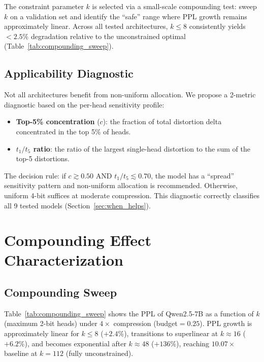 \documentclass[11pt,a4paper]{article}
\begin{document}
The constraint parameter $k$ is selected via a small-scale compounding test: sweep $k$ on a validation set and identify the ``safe'' range where PPL growth remains approximately linear.
Across all tested architectures, $k \le 8$ consistently yields $<2.5\%$ degradation relative to the unconstrained optimal (Table~\ref{tab:compounding_sweep}).

\subsection{Applicability Diagnostic}

Not all architectures benefit from non-uniform allocation.
We propose a 2-metric diagnostic based on the per-head sensitivity profile:

\begin{itemize}[leftmargin=*,itemsep=2pt]
\item \textbf{Top-5\% concentration} ($c$): the fraction of total distortion delta concentrated in the top 5\% of heads.
\item \textbf{$t_1/t_5$ ratio}: the ratio of the largest single-head distortion to the sum of the top-5 distortions.
\end{itemize}

The decision rule: if $c \gtrsim 0.50$ AND $t_1/t_5 \lesssim 0.70$, the model has a ``spread'' sensitivity pattern and non-uniform allocation is recommended.
Otherwise, uniform 4-bit suffices at moderate compression.
This diagnostic correctly classifies all 9 tested models (Section~\ref{sec:when_helps}).


\section{Compounding Effect Characterization}
\label{sec:compounding}

\subsection{Compounding Sweep}

Table~\ref{tab:compounding_sweep} shows the PPL of Qwen2.5-7B as a function of $k$ (maximum 2-bit heads) under $4\times$ compression (budget$=0.25$).
PPL growth is approximately linear for $k \le 8$ ($+2.4\%$), transitions to superlinear at $k \approx 16$ ($+6.2\%$), and becomes exponential after $k \approx 48$ ($+136\%$), reaching $10.07\times$ baseline at $k = 112$ (fully unconstrained).
\end{document}
